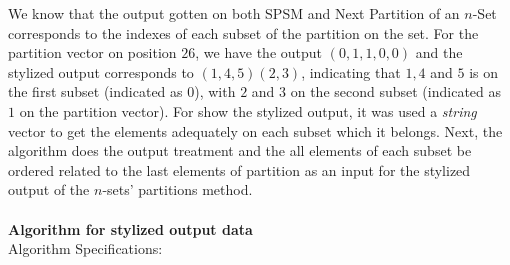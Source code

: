\documentclass {amsart}
\begin{document}
We know that the output gotten on both SPSM and Next Partition of
an {$n$}-Set corresponds to the indexes of each subset of the
partition on the set. For the partition vector on position {$26$},
we have the output {$(0,1,1,0,0)$} and the stylized output
corresponds to {$(1,4,5)(2,3)$}, indicating that {$1,4$} and {$5$}
is on the first subset (indicated as {$0$}), with {$2$} and {$3$}
on the second subset (indicated as {$1$} on the partition vector).
For show the stylized output, it was used a \emph{string} vector
to get the elements adequately on each subset which it belongs.
Next, the algorithm does the output treatment and the all elements
of each subset be ordered related to the last elements of
partition as an input for the stylized output of the {$n$}-sets'
partitions method.
\\\\
\textbf{Algorithm for stylized output data}\\
Algorithm Specifications:
\end{document}
